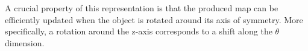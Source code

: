 \documentclass{aamas2015}
\begin{document}
A crucial property of this representation is that the produced map can
be efficiently updated when the object is rotated around its axis of symmetry. More specifically, a
rotation around the z-axis corresponds to a shift along the $\theta$ dimension. 

\begin{enumerate}
%     
%     
%     
%     
%     
%     
%   
	

\end{enumerate}
\end{document}

